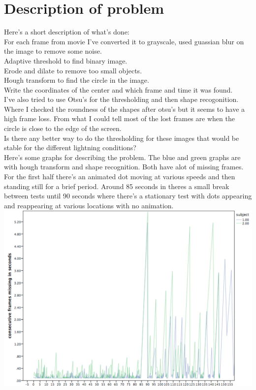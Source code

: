 \documentclass{article}
\begin{document}
\section*{Description of problem}
\noindent Here's a short description of what's done: \\
For each frame from movie I've converted it to grayscale, used guassian blur on the image to remove some noise.\\
Adaptive threshold to find binary image.\\
Erode and dilate to remove too small objects.\\
Hough transform to find the circle in the image.\\
Write the coordinates of the center and which frame and time it was found.\\

\noindent I've also tried to use Otsu's for the thresholding and then shape recogonition. Where I checked the roundness of the shapes after otsu's but it seems to have a high frame loss. From what I could tell most of the lost frames are when the circle is close to the edge of the screen.\\

\noindent Is there any better way to do the thresholding for these images that would be stable for the different lightning conditions? \\

\noindent Here's some graphs for describing the problem. The blue and green graphs are with hough transform and shape recognition. Both have alot of missing frames. For the first half there's an animated dot moving at various speeds and then standing still for a brief period. Around 85 seconds in theres a small break between tests until 90 seconds where there's a stationary test with dots appearing and reappearing at various locations with no animation. \\

\noindent \includegraphics[scale=0.4]{./img/consec_frames_full.png}
\end{document}

